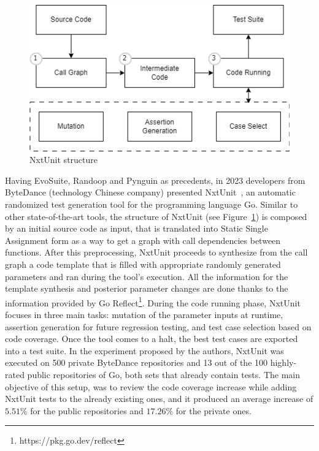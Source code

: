 \documentclass[%
  chapterprefix=false,%
  open=right,%
  twoside=true,%
  paper=a4,%
  logofile={Figures/logo.png},%
  thesistype=master,%
  UKenglish,%
]{se2thesis}
\begin{document}
\begin{figure}[bt]
  \centering
  \includegraphics[width=.99\textwidth]{Figures/nxtunit2.png}
  \caption{NxtUnit structure}\label{fig:nxt}
\end{figure}

Having EvoSuite, Randoop and Pynguin as precedents, in 2023 developers from ByteDance (technology Chinese company) presented NxtUnit~\cite{DBLP:conf/ease/WangMCGSP23}, an automatic randomized test generation tool for the programming language Go.
Similar to other state-of-the-art tools, the structure of NxtUnit (see Figure~\ref{fig:nxt}) is composed by an initial source code as input, that is translated into Static Single Assignment form as a way to get a graph with call dependencies between functions.
After this preprocessing, NxtUnit proceeds to synthesize from the call graph a code template that is filled with appropriate randomly generated parameters and ran during the tool's execution.
All the information for the template synthesis and posterior parameter changes are done thanks to the information provided by Go Reflect\footnote{https://pkg.go.dev/reflect}.
During the code running phase, NxtUnit focuses in three main tasks: mutation of the parameter inputs at runtime, assertion generation for future regression testing, and test case selection based on code coverage.
Once the tool comes to a halt, the best test cases are exported into a test suite.
In the experiment proposed by the authors, NxtUnit was executed on 500 private ByteDance repositories and 13 out of the 100 highly-rated public repositories of Go, both sets that already contain tests.
The main objective of this setup, was to review the code coverage increase while adding NxtUnit tests to the already existing ones, and it produced an average increase of \(5.51\%\) for the public repositories and \(17.26\%\) for the private ones.
\end{document}
